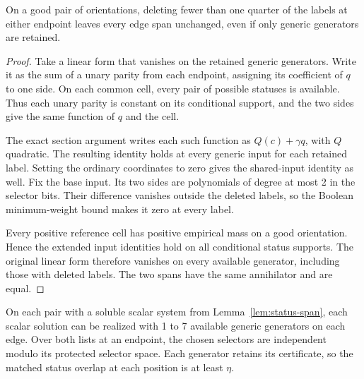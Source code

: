 \begin{lemma}\label{lem:span-continuation}
On a good pair of orientations, deleting fewer than one quarter of the
labels at either endpoint leaves every edge span unchanged, even if only
generic generators are retained.
\end{lemma}
\begin{proof}
Take a linear form that vanishes on the retained generic generators. Write it
as the sum of a unary parity from each endpoint, assigning its coefficient
of $q$ to one side. On each common cell, every pair of possible statuses
is available. Thus each unary parity is constant on its conditional
support, and the two sides give the same function of $q$ and the cell.

The exact section argument writes each such function as $Q(c)+\gamma q$,
with $Q$ quadratic. The resulting identity holds at every generic input
for each retained label. Setting the ordinary coordinates to zero gives
the shared-input identity as well. Fix the base input. Its two sides are polynomials
of degree at most 2 in the selector bits. Their difference vanishes
outside the deleted labels, so the Boolean minimum-weight bound makes it
zero at every label.

Every positive reference cell has positive empirical mass on a good
orientation. Hence the extended input identities hold on all conditional
status supports. The original linear form therefore vanishes on every
available generator, including those with deleted labels. The two spans
have the same annihilator and are equal.
\end{proof}

\begin{lemma}
\label{lem:fresh-lists}
On each pair with a soluble scalar system from Lemma~\ref{lem:status-span},
each scalar solution can be realized with 1 to 7 available generic
generators on each edge. Over both lists at an endpoint, the chosen
selectors are independent modulo its protected selector space. Each
generator retains its certificate, so the matched status overlap at
each position is at least \(\eta\).
\end{lemma}


